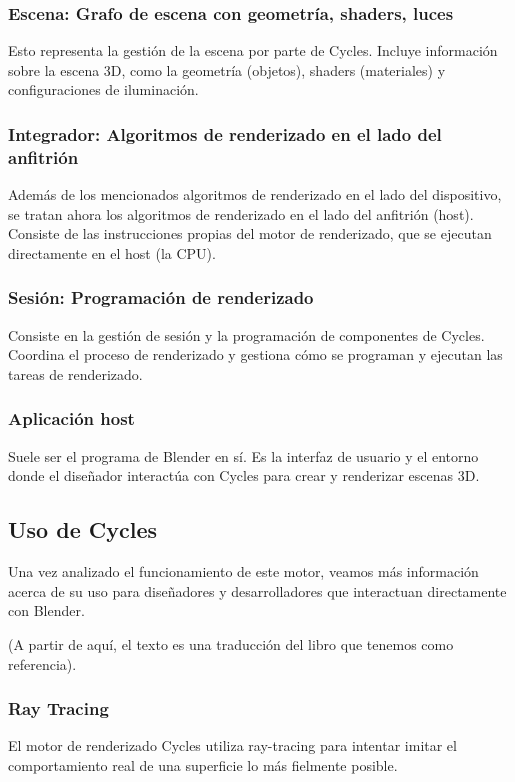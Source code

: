 \documentclass{article}
\begin{document}
\subsubsection{Escena: Grafo de escena con geometría, shaders, luces}
Esto representa la gestión de la escena por parte de Cycles. Incluye información sobre la 
escena 3D, como la geometría (objetos), shaders (materiales) y configuraciones de iluminación.

\subsubsection{Integrador: Algoritmos de renderizado en el lado del anfitrión}
Además de los mencionados algoritmos de renderizado en el lado del dispositivo, se tratan ahora
los algoritmos de renderizado en el lado del anfitrión (host). Consiste de las instrucciones
propias del motor de renderizado, que se ejecutan directamente en el host (la CPU).

\subsubsection{Sesión: Programación de renderizado}
Consiste en la gestión de sesión y la programación de componentes de Cycles. Coordina el 
proceso de renderizado y gestiona cómo se programan y ejecutan las tareas de renderizado.

\subsubsection{Aplicación host}
Suele ser el programa de Blender en sí. Es la interfaz de usuario y el entorno donde el 
diseñador interactúa con Cycles para crear y renderizar escenas 3D.


\subsection{Uso de Cycles}
Una vez analizado el funcionamiento de este motor, veamos más información acerca de su uso para
diseñadores y desarrolladores que interactuan directamente con Blender.

(A partir de aquí, el texto es una traducción del libro que tenemos como referencia).

\subsubsection{Ray Tracing}
El motor de renderizado Cycles utiliza ray-tracing para intentar imitar el comportamiento 
real de una superficie lo más fielmente posible.
\end{document}
